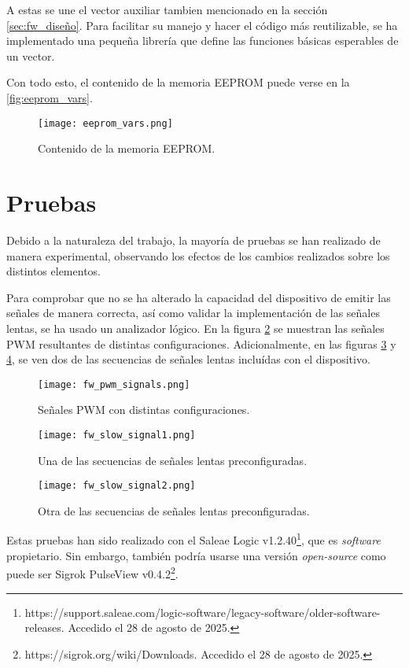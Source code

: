 A estas se une el vector auxiliar tambien mencionado en la sección \ref{sec:fw_diseño}. Para facilitar su manejo y hacer el código más reutilizable, se ha implementado una pequeña librería que define las funciones básicas esperables de un vector.

Con todo esto, el contenido de la memoria EEPROM puede verse en la \autoref{fig:eeprom_vars}.

\begin{figure}[h!]
    \centering
    \texttt{[image: eeprom\_vars.png]}
    \caption{Contenido de la memoria EEPROM.}
    \label{fig:eeprom_vars}
\end{figure}

\section{Pruebas}

Debido a la naturaleza del trabajo, la mayoría de pruebas se han realizado de manera experimental, observando los efectos de los cambios realizados sobre los distintos elementos.

Para comprobar que no se ha alterado la capacidad del dispositivo de emitir las señales de manera correcta, así como validar la implementación de las señales lentas, se ha usado un analizador lógico. En la figura \ref{fig:fw_pwm_signals} se muestran las señales PWM resultantes de distintas configuraciones. Adicionalmente, en las figuras \ref{fig:fw_slow_signal1} y \ref{fig:fw_slow_signal2}, se ven dos de las secuencias de señales lentas incluídas con el dispositivo.

\begin{figure}[h!]
    \centering
    \texttt{[image: fw\_pwm\_signals.png]}
    \caption{Señales PWM con distintas configuraciones.}
    \label{fig:fw_pwm_signals}
\end{figure}

\begin{figure}[h!]
    \centering
    \texttt{[image: fw\_slow\_signal1.png]}
    \caption{Una de las secuencias de señales lentas preconfiguradas.}
    \label{fig:fw_slow_signal1}
\end{figure}

\begin{figure}[h!]
    \centering
    \texttt{[image: fw\_slow\_signal2.png]}
    \caption{Otra de las secuencias de señales lentas preconfiguradas.}
    \label{fig:fw_slow_signal2}
\end{figure}

Estas pruebas han sido realizado con el Saleae Logic v1.2.40\footnote{https://support.saleae.com/logic-software/legacy-software/older-software-releases. Accedido el 28 de agosto de 2025.}, que es \textit{software} propietario. Sin embargo, también podría usarse una versión \textit{open-source} como puede ser Sigrok PulseView v0.4.2\footnote{https://sigrok.org/wiki/Downloads. Accedido el 28 de agosto de 2025.}.

